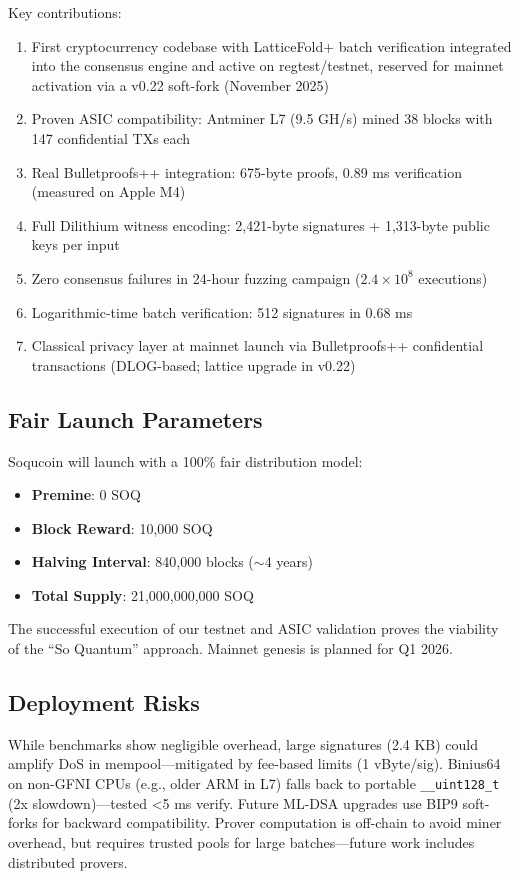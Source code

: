 \documentclass[10pt]{article}
\begin{document}
Key contributions:
\begin{enumerate}
\item First cryptocurrency codebase with LatticeFold+ batch verification integrated into the consensus engine and active on regtest/testnet, reserved for mainnet activation via a v0.22 soft-fork (November 2025)
\item Proven ASIC compatibility: Antminer L7 (9.5 GH/s) mined 38 blocks with 147 confidential TXs each
\item Real Bulletproofs++ integration: 675-byte proofs, 0.89 ms verification (measured on Apple M4)
\item Full Dilithium witness encoding: 2,421-byte signatures + 1,313-byte public keys per input
\item Zero consensus failures in 24-hour fuzzing campaign ($2.4 \times 10^8$ executions)
\item Logarithmic-time batch verification: 512 signatures in 0.68 ms
\item Classical privacy layer at mainnet launch via Bulletproofs++ confidential transactions (DLOG-based; lattice upgrade in v0.22)
\end{enumerate}

\subsection{Fair Launch Parameters}
Soqucoin will launch with a 100\% fair distribution model:
\begin{itemize}
    \item \textbf{Premine}: 0 SOQ
    \item \textbf{Block Reward}: 10,000 SOQ
    \item \textbf{Halving Interval}: 840,000 blocks ($\sim$4 years)
    \item \textbf{Total Supply}: 21,000,000,000 SOQ
\end{itemize}

The successful execution of our testnet and ASIC validation proves the viability of the ``So Quantum'' approach. Mainnet genesis is planned for Q1 2026.

\subsection{Deployment Risks}
While benchmarks show negligible overhead, large signatures (2.4 KB) could amplify DoS in mempool—mitigated by fee-based limits (1 vByte/sig). Binius64 on non-GFNI CPUs (e.g., older ARM in L7) falls back to portable \texttt{\_\_uint128\_t} (2x slowdown)—tested <5 ms verify. Future ML-DSA upgrades use BIP9 soft-forks for backward compatibility. Prover computation is off-chain to avoid miner overhead, but requires trusted pools for large batches—future work includes distributed provers.
\end{document}
